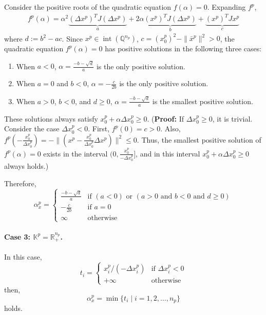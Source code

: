 Consider the positive roots of the quadratic equation $f(\alpha)=0$. %
Expanding $f^p$,
\begin{align*}
    f^p(\alpha) = \alpha^2\underbrace{(\Delta x^p)^T J (\Delta x^p)}_a + 2 \alpha \underbrace{(x^p)^T J (\Delta x^p)}_b + \underbrace{(x^p)^T J x^p}_c
\end{align*}
where $d:=b^2-ac$.
Since $x^p\in \operatorname{int}(\mathbb{Q}^{n_p})$, $c = (x^p_0)^2 - \|\bar{x}^p\|^2 > 0$, the quadratic equation $f^p(\alpha) = 0$ has positive solutions in the following three cases:
\begin{enumerate}
    \item When $a<0$, $\alpha=\frac{-b-\sqrt{d}}{a}$ is the only positive solution.
    \item When $a=0$ and $b<0$, $\alpha=-\frac{c}{2b}$ is the only positive solution.
    \item When $a>0$, $b<0$, and $d\geq 0$, $\alpha=\frac{-b-\sqrt{d}}{a}$ is the smallest positive solution.
\end{enumerate}
These solutions always satisfy $x^p_0+\alpha \Delta x^p_0\geq 0$.
(\textbf{Proof:} If $\Delta x^p_0 \geq 0$, it is trivial. Consider the case $\Delta x^p_0 < 0$. First, $f^p(0)=c>0$. Also,
$f^p(-\frac{x^p_0}{\Delta x^p_0}) = - \|(x^p -\frac{x^p_0}{\Delta x^p_0} \Delta x^p)\|^2 \leq 0$.
Thus, the smallest positive solution of $f^p(\alpha) = 0$ exists in the interval $\big(0, \frac{x^p_0}{-\Delta x^p_0}\big]$, and in this interval $x^p_0+\alpha \Delta x^p_0\geq 0$ always holds.)

Therefore,
\begin{equation*}
    \alpha^p_x=\begin{cases}
       \frac{-b - \sqrt{d}}{a} & \text{if } (a < 0) \text{ or } (a > 0 \text{ and } b < 0 \text{ and } d \geq 0)\\
       -\frac{c}{2b} & \text{if $a=0$} \\
       \infty & \text{otherwise}
    \end{cases}
\end{equation*}

\paragraph{Case 3: $\mathbb{K}^p = \mathbb{R}^{n_p}_+$.}
In this case,
\[
t_i= \begin{cases}
    x^p_i / (-\Delta x^p_i) & \text{if } \Delta x^p_i < 0 \\
    +\infty & \text{otherwise}
\end{cases}
\]
then,
\[
    \alpha^p_x = \min\{t_i \mid i=1,2,\ldots,n_p\}
\]
holds.


